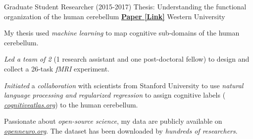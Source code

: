 \begin{cventries}
  \cventry
    {Graduate Student Researcher (2015-2017)} %
    {Thesis: Understanding the functional organization of the human cerebellum}
    {\href{http://ivrylab.berkeley.edu/uploads/4/1/1/5/41152143/functional_boundaries_in_the_human_cerebellum.pdf}{\textbf{Paper [Link]}}}
    {Western University} %
    {
      \begin{cvitems} %
        \item {My thesis used \textit{machine learning} to map cognitive sub-domains of the human cerebellum.}
      	\item {\textit{Led a team of 2} (1 research assistant and one post-doctoral fellow) to design and collect a 26-task \textit{fMRI} experiment.}
      	\item {\textit{Initiated} a \textit{collaboration} with scientists from Stanford University to use \textit{natural language processing and regularized regression} to assign cognitive labels ( {\href{https://cognitiveatlas.org/}{\textit{cognitiveatlas.org}}}) to the human cerebellum.}
      	\item {Passionate about \textit{open-source science}, my data are publicly available on {\href{https://openneuro.org/datasets/ds002105/versions/1.1.0}{\textit{openneuro.org}}}. The dataset has been downloaded by \textit{hundreds of researchers}.}
      \end{cvitems}
    }

\end{cventries}
